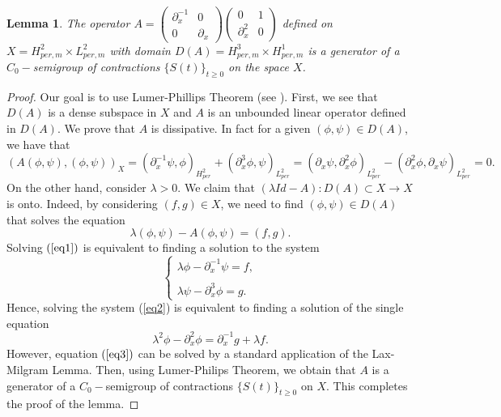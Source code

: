 \documentclass[12pt,reqno,a4paper]{amsart} %
\numberwithin{equation}{section}
\numberwithin{figure}{section}
\newtheorem{lemma}[theorem]{Lemma}
\begin{document}
\begin{lemma}\label{lemmaC0}The operator $A=\left(\begin{array}{lll}\partial_x^{-1}&  0\\ 0&  \partial_x\end{array}\right)\left(\begin{array}{lll}0&  1\\ \partial_x^2&  0\end{array}\right)$ defined on $X=H_{per,m}^2\times L_{per,m}^2$ with domain $D(A)=H_{per,m}^3\times H_{per,m}^1$ is a generator of a $C_0-$semigroup of 
contractions $\{S(t)\}_{t\geq0}$ on the space $X$.
\end{lemma}
\begin{proof}
Our goal is to use Lumer-Phillips Theorem (see \cite[Chapter 1, Theorem 4.3]{pazy}). First, we see that $D(A)$ is a dense subspace in $X$ and $A$ is an unbounded 
linear operator defined in $D(A)$. We prove that
$A$ is dissipative. In fact for a given $(\phi,\psi)\in D(A)$, we have that 
\begin{equation*}
 \left(A(\phi,\psi),(\phi,\psi)\right)_{X}=(\partial_x^{-1}\psi,\phi)_{H_{per}^2}  +(\partial_x^3\phi,\psi)_{L_{per}^2}  =(\partial_x\psi,\partial_x^2\phi)_{L_{per}^2}  -(\partial_x^2\phi,\partial_x\psi)_{L_{per}^2} =0.
\end{equation*}
On the other hand, consider $\lambda>0$. We claim that $(\lambda Id -A):D(A)\subset X \rightarrow X$ is onto. Indeed, by considering $(f,g)\in X$, we need to find $(\phi,\psi)\in D(A)$ that solves the equation
\begin{equation}\label{eq1}
	\lambda(\phi,\psi)-A(\phi,\psi)= (f,g).
	\end{equation}
\indent Solving $(\ref{eq1})$ is equivalent to finding a solution to the system
\begin{equation}\label{eq2}
	\left\{\begin{array}{llll}\lambda \phi-\partial_x^{-1}\psi=f,\\\\
		\lambda \psi-\partial_x^3\phi=g.
	\end{array}\right.
	\end{equation}
Hence, solving the system (\ref{eq2}) is equivalent to finding a solution of the single equation 
\begin{equation}\label{eq3}
	\lambda^2\phi-\partial_x^2\phi=\partial_x^{-1}g+\lambda f.
\end{equation}
However, equation $(\ref{eq3})$ can be solved by a standard application of the Lax-Milgram Lemma. Then, using Lumer-Philips Theorem, we obtain that $A$ is a generator of a $C_0-$semigroup of contractions $\{S(t)\}_{t\geq0}$ on $X$. This completes the proof of the lemma.
\end{proof}
\end{document}
